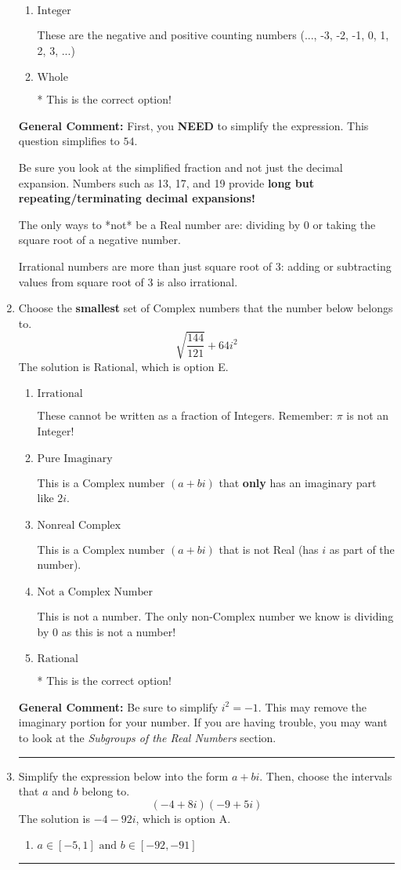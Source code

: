 \documentclass{extbook}[14pt]
\newcommand{\litem}[1]{\item #1

\rule{\textwidth}{0.4pt}}
\begin{document}
\begin{enumerate}
{\begin{enumerate}[label=\Alph*.]
These are numbers that can be written as fraction of Integers (e.g., -2/3)
\item \( \text{Integer} \)

These are the negative and positive counting numbers (..., -3, -2, -1, 0, 1, 2, 3, ...)
\item \( \text{Whole} \)

* This is the correct option!
\end{enumerate}

\textbf{General Comment:} First, you \textbf{NEED} to simplify the expression. This question simplifies to $54$. 
 
 Be sure you look at the simplified fraction and not just the decimal expansion. Numbers such as 13, 17, and 19 provide \textbf{long but repeating/terminating decimal expansions!} 
 
 The only ways to *not* be a Real number are: dividing by 0 or taking the square root of a negative number. 
 
 Irrational numbers are more than just square root of 3: adding or subtracting values from square root of 3 is also irrational.
}
\litem{
Choose the \textbf{smallest} set of Complex numbers that the number below belongs to.
\[ \sqrt{\frac{144}{121}} + 64i^2 \]The solution is \( \text{Rational} \), which is option E.\begin{enumerate}[label=\Alph*.]
\item \( \text{Irrational} \)

These cannot be written as a fraction of Integers. Remember: $\pi$ is not an Integer!
\item \( \text{Pure Imaginary} \)

This is a Complex number $(a+bi)$ that \textbf{only} has an imaginary part like $2i$.
\item \( \text{Nonreal Complex} \)

This is a Complex number $(a+bi)$ that is not Real (has $i$ as part of the number).
\item \( \text{Not a Complex Number} \)

This is not a number. The only non-Complex number we know is dividing by 0 as this is not a number!
\item \( \text{Rational} \)

* This is the correct option!
\end{enumerate}

\textbf{General Comment:} Be sure to simplify $i^2 = -1$. This may remove the imaginary portion for your number. If you are having trouble, you may want to look at the \textit{Subgroups of the Real Numbers} section.
}
\litem{
Simplify the expression below into the form $a+bi$. Then, choose the intervals that $a$ and $b$ belong to.
\[ (-4 + 8 i)(-9 + 5 i) \]The solution is \( -4 - 92 i \), which is option A.\begin{enumerate}[label=\Alph*.]
\item \( a \in [-5, 1] \text{ and } b \in [-92, -91] \)


\end{enumerate}}
\end{enumerate}
\end{document}
